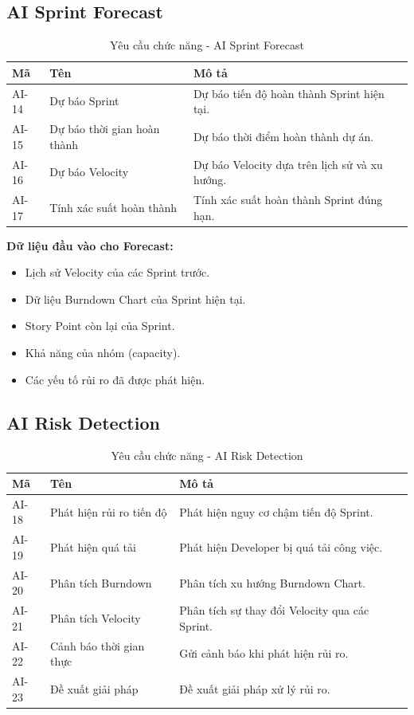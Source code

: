 \documentclass[12pt,a4paper]{report}
\begin{document}
\subsection{AI Sprint Forecast}

\begin{table}[H]
\centering
\caption{Yêu cầu chức năng - AI Sprint Forecast}
\begin{tabular}{|p{2.5cm}|p{3.5cm}|p{8cm}|}
\hline
\textbf{Mã} & \textbf{Tên} & \textbf{Mô tả} \\
\hline
AI-14 & Dự báo Sprint & Dự báo tiến độ hoàn thành Sprint hiện tại. \\
\hline
AI-15 & Dự báo thời gian hoàn thành & Dự báo thời điểm hoàn thành dự án. \\
\hline
AI-16 & Dự báo Velocity & Dự báo Velocity dựa trên lịch sử và xu hướng. \\
\hline
AI-17 & Tính xác suất hoàn thành & Tính xác suất hoàn thành Sprint đúng hạn. \\
\hline
\end{tabular}
\label{tab:ai_forecast_requirements}
\end{table}

\textbf{Dữ liệu đầu vào cho Forecast:}

\begin{itemize}
\item Lịch sử Velocity của các Sprint trước.
\item Dữ liệu Burndown Chart của Sprint hiện tại.
\item Story Point còn lại của Sprint.
\item Khả năng của nhóm (capacity).
\item Các yếu tố rủi ro đã được phát hiện.
\end{itemize}

\subsection{AI Risk Detection}

\begin{table}[H]
\centering
\caption{Yêu cầu chức năng - AI Risk Detection}
\begin{tabular}{|p{2.5cm}|p{3.5cm}|p{8cm}|}
\hline
\textbf{Mã} & \textbf{Tên} & \textbf{Mô tả} \\
\hline
AI-18 & Phát hiện rủi ro tiến độ & Phát hiện nguy cơ chậm tiến độ Sprint. \\
\hline
AI-19 & Phát hiện quá tải & Phát hiện Developer bị quá tải công việc. \\
\hline
AI-20 & Phân tích Burndown & Phân tích xu hướng Burndown Chart. \\
\hline
AI-21 & Phân tích Velocity & Phân tích sự thay đổi Velocity qua các Sprint. \\
\hline
AI-22 & Cảnh báo thời gian thực & Gửi cảnh báo khi phát hiện rủi ro. \\
\hline
AI-23 & Đề xuất giải pháp & Đề xuất giải pháp xử lý rủi ro. \\
\hline
\end{tabular}
\label{tab:ai_risk_requirements}
\end{table}
\end{document}
